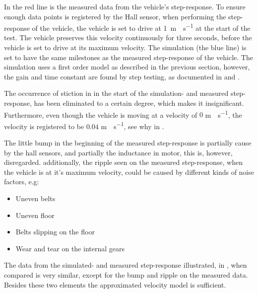 In  the red line is the measured data from the vehicle's step-response. To ensure enough data points is registered by the Hall sensor, when performing the step-response of the vehicle, the vehicle is set to drive at \si{1 m\cdot s^{-1}} at the start of the test. The vehicle preserves this velocity continuously for three seconds, before the vehicle is set to drive at its maximum velocity. The simulation (the blue line) is set to have the same milestones as the measured step-response of the vehicle.
The simulation uses a first order model as described in the previous section, however, the gain and time constant are found by step testing, as documented in  and .

The occurrence of stiction in in the start of the simulation- and measured step-response, has been eliminated to a certain degree, which makes it insignificant. Furthermore, even though the vehicle is moving at a velocity of $0$ \si{m \cdot s^{-1}}, the velocity is registered to be $0.04$ \si{m \cdot s^{-1}}, see why in . 

The little bump in the beginning of the measured step-response is partially cause by the hall sensors, and partially the inductance in motor, this is, however, disregarded. additionally, the ripple seen on the measured step-response, when the vehicle is at it's maximum velocity, could be caused by different kinds of noise factors, e.g:

\begin{itemize}
\item Uneven belts 
\item Uneven floor
\item Belts slipping on the floor
\item Wear and tear on the internal gears
\end{itemize}

The data from the simulated- and measured step-response illustrated, in , when compared is very similar, except for the bump and ripple on the measured data. Besides these two elements the approximated velocity model is sufficient.